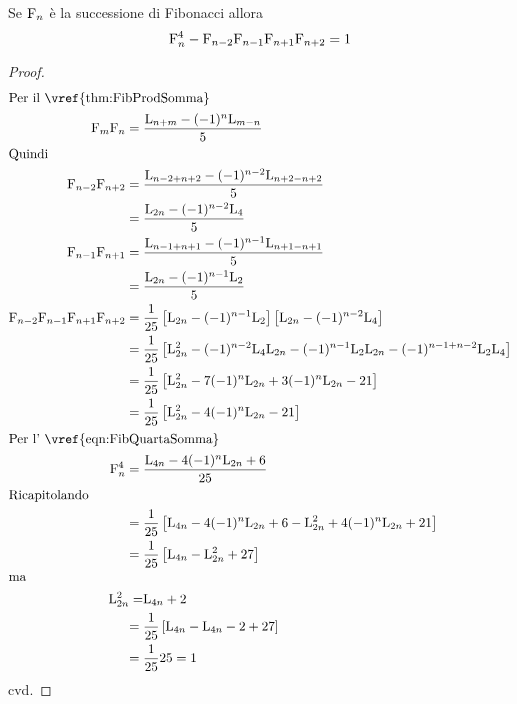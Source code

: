 \begin{thm}\label{thm:FibGelinCesaro}
	Se $\mathrm{F}_{n}$ è la successione di Fibonacci allora 
	\begin{equation}
	\mathrm{F}_{n}^4-\mathrm{F}_{n-2}\mathrm{F}_{n-1}\mathrm{F}_{n+1}\mathrm{F}_{n+2}=1
	\end{equation}\label{eqn:FibGelinCesaro}
\end{thm}
\begin{proof}
\begin{align*}
		\intertext{Per il~\vref{thm:FibProdSomma}}
	\Fib{m}\Fib{n}={}&\dfrac{\Luc{n+m}-(-1)^n\Luc{m-n}}{5}\\
	\intertext{Quindi}
	\Fib{n-2}\Fib{n+2}={}&\dfrac{\Luc{n-2+n+2}-(-1)^{n-2}\Luc{n+2-n+2}}{5}\\
={}&\dfrac{\Luc{2n}-(-1)^{n-2}\Luc{4}}{5}\\
	\Fib{n-1}\Fib{n+1}={}&\dfrac{\Luc{n-1+n+1}-(-1)^{n-1}\Luc{n+1-n+1}}{5}\\
={}&\dfrac{\Luc{2n}-(-1)^{n-1}\Luc{2}}{5}\\
	\Fib{n-2}\Fib{n-1}\Fib{n+1}\Fib{n+2}
={}&\dfrac{1}{25}\left[\Luc{2n}-(-1)^{n-1}\Luc{2}\right]\left[\Luc{2n}-(-1)^{n-2}\Luc{4}\right]\\
={}&\dfrac{1}{25}\left[\Luc{2n}^2-(-1)^{n-2}\Luc{4}\Luc{2n}-(-1)^{n-1}\Luc{2}\Luc{2n}-(-1)^{n-1+n-2}\Luc{2}\Luc{4}\right]\\
={}&\dfrac{1}{25}\left[\Luc{2n}^2-7(-1)^{n}\Luc{2n}+3(-1)^{n}\Luc{2n}-21\right]\\
={}&\dfrac{1}{25}\left[\Luc{2n}^2-4(-1)^{n}\Luc{2n}-21\right]\\
	\intertext{Per l'~\vref{eqn:FibQuartaSomma}}
	\Fib{n}^4={}&\dfrac{\Luc{4n}-4(-1)^n\Luc{2n}+6}{25}\\
	\intertext{Ricapitolando}
={}&\dfrac{1}{25}\left[\Luc{4n}-4(-1)^n\Luc{2n}+6-\Luc{2n}^2+4(-1)^{n}\Luc{2n}+21\right]\\
={}&\dfrac{1}{25}\left[\Luc{4n}-\Luc{2n}^2+27\right]\\
	\intertext{ma}
	\Luc{2n}^2=&\Luc{4n}+2\\
={}&\dfrac{1}{25}\left[\Luc{4n}-\Luc{4n}-2+27\right]\\
={}&\dfrac{1}{25}25=1\\
\end{align*}
cvd.
\end{proof}
